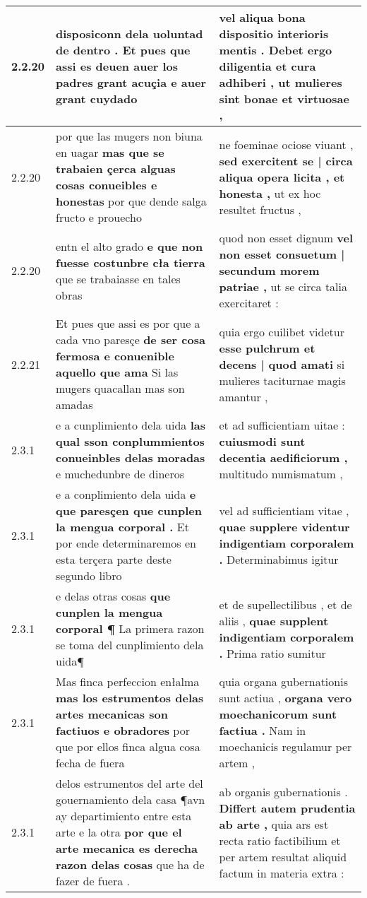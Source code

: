 \begin{tabular}{|p{1cm}|p{6.5cm}|p{6.5cm}|}
2.2.20 & disposiconn dela uoluntad de dentro . \textbf{ Et pues que assi es deuen auer los padres grant acuçia } e auer grant cuydado & vel aliqua bona dispositio interioris mentis . \textbf{ Debet ergo diligentia et cura adhiberi , } ut mulieres sint bonae et virtuosae , \\\hline
2.2.20 & por que las mugers non biuna en uagar \textbf{ mas que se trabaien çerca alguas cosas conueibles e honestas } por que dende salga fructo e prouecho & ne foeminae ociose viuant , \textbf{ sed exercitent se | circa aliqua opera licita , et honesta , } ut ex hoc resultet fructus , \\\hline
2.2.20 & entn el alto grado \textbf{ e que non fuesse costunbre cła tierra } que se trabaiasse en tales obras & quod non esset dignum \textbf{ vel non esset consuetum | secundum morem patriae , } ut se circa talia exercitaret : \\\hline
2.2.21 & Et pues que assi es por que a cada vno paresçe \textbf{ de ser cosa fermosa e conuenible aquello que ama } Si las mugers quacallan mas son amadas & quia ergo cuilibet videtur \textbf{ esse pulchrum et decens | quod amati } si mulieres taciturnae magis amantur , \\\hline
2.3.1 & e a cunplimiento dela uida \textbf{ las qual sson conplummientos conueinbles delas moradas } e muchedunbre de dineros & et ad sufficientiam uitae : \textbf{ cuiusmodi sunt decentia aedificiorum , } multitudo numismatum , \\\hline
2.3.1 & e a conplimiento dela uida \textbf{ e que paresçen que cunplen la mengua corporal . } Et por ende determinaremos en esta terçera parte deste segundo libro & vel ad sufficientiam vitae , \textbf{ quae supplere videntur indigentiam corporalem . } Determinabimus igitur \\\hline
2.3.1 & e delas otras cosas \textbf{ que cunplen la mengua corporal ¶ } La primera razon se toma del cunplimiento dela uida¶ & et de supellectilibus , et de aliis , \textbf{ quae supplent indigentiam corporalem . } Prima ratio sumitur \\\hline
2.3.1 & Mas finca perfeccion enłalma \textbf{ mas los estrumentos delas artes mecanicas son factiuos e obradores } por que por ellos finca algua cosa fecha de fuera & quia organa gubernationis sunt actiua , \textbf{ organa vero moechanicorum sunt factiua . } Nam in moechanicis regulamur per artem , \\\hline
2.3.1 & delos estrumentos del arte del gouernamiento dela casa ¶avn ay departimiento entre esta arte e la otra \textbf{ por que el arte mecanica es derecha razon delas cosas } que ha de fazer de fuera . & ab organis gubernationis . \textbf{ Differt autem prudentia ab arte , } quia ars est recta ratio factibilium et per artem resultat aliquid factum in materia extra : \\\hline

\end{tabular}
